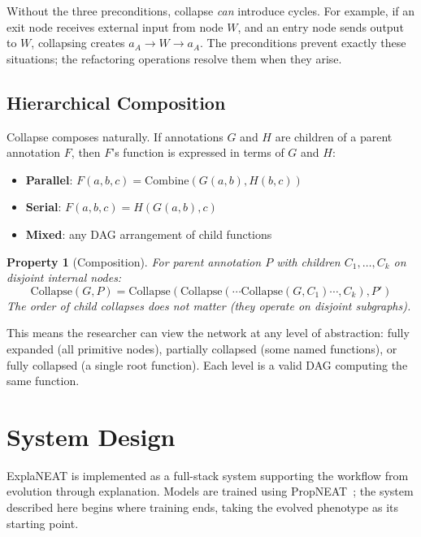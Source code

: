 \documentclass[11pt]{article}
\newtheorem{property}{Property}
\begin{document}
Without the three preconditions, collapse \emph{can} introduce cycles. For example, if an exit node receives external input from node $W$, and an entry node sends output to $W$, collapsing creates $a_A \to W \to a_A$. The preconditions prevent exactly these situations; the refactoring operations resolve them when they arise.

\subsection{Hierarchical Composition}

Collapse composes naturally. If annotations $G$ and $H$ are children of a parent annotation $F$, then $F$'s function is expressed in terms of $G$ and $H$:

\begin{itemize}
    \item \textbf{Parallel}: $F(a,b,c) = \text{Combine}(G(a,b), H(b,c))$
    \item \textbf{Serial}: $F(a,b,c) = H(G(a,b), c)$
    \item \textbf{Mixed}: any DAG arrangement of child functions
\end{itemize}

\begin{property}[Composition]
For parent annotation $P$ with children $C_1, \ldots, C_k$ on disjoint internal nodes:
\[
\text{Collapse}(G, P) = \text{Collapse}(\text{Collapse}(\cdots\text{Collapse}(G, C_1)\cdots, C_k), P')
\]
The order of child collapses does not matter (they operate on disjoint subgraphs).
\end{property}

This means the researcher can view the network at any level of abstraction: fully expanded (all primitive nodes), partially collapsed (some named functions), or fully collapsed (a single root function). Each level is a valid DAG computing the same function.


\section{System Design}
\label{sec:system}

ExplaNEAT is implemented as a full-stack system supporting the workflow from evolution through explanation. Models are trained using PropNEAT~\cite{merry2025propneat}; the system described here begins where training ends, taking the evolved phenotype as its starting point.
\end{document}
